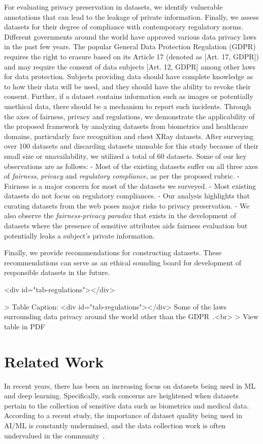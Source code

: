 \documentclass[journal]{IEEEtran}
\begin{document}
For evaluating privacy preservation in datasets, we identify vulnerable annotations that can lead to the leakage of private information. Finally, we assess datasets for their degree of compliance with contemporary regulatory norms. Different governments around the world have approved various data privacy laws in the past few years. The popular General Data Protection Regulation (GDPR)~\cite{regulation2016regulation} requires the right to erasure based on its Article 17 (denoted as [Art. 17, GDPR]) and may require the consent of data subjects [Art. 12, GDPR] among other laws for data protection. Subjects providing data should have complete knowledge as to how their data will be used, and they should have the ability to revoke their consent. Further, if a dataset contains information such as images or potentially unethical data, there should be a mechanism to report such incidents. 
Through the axes of fairness, privacy and regulations, we demonstrate the applicability of the proposed framework by analyzing datasets from biometrics and healthcare domains, particularly face recognition and chest XRay datasets. After surveying over 100 datasets and discarding datasets unusable for this study
because of their small size or unavailability, we utilized a total of 60 datasets. Some of our key observations are as follows: 
-  Most of the existing datasets suffer on all three axes of \textit{fairness}, \textit{privacy} and \textit{regulatory compliance}, as per the proposed rubric.
-  Fairness is a major concern for most of the datasets we surveyed.
-  Most existing datasets do not focus on regulatory compliances.
-  Our analysis highlights that curating datasets from the web poses major risks to privacy preservation.
- We also observe the \textit{fairness-privacy paradox} that exists in the development of datasets where the presence of sensitive attributes aids fairness evaluation but potentially leaks a subject’s private information.

Finally, we provide recommendations for constructing datasets. These recommendations can serve as an ethical sounding board for development of responsible datasets in the future.
\begin{table}<div id="tab-regulations"></div>

> Table Caption: <div id="tab-regulations"></div>
 Some of the laws surrounding data privacy around the world other than the GDPR~\cite{regulation2016regulation}.<br>
> View table in PDF
\end{table}

\section{Related Work}
In recent years, there has been an increasing focus on datasets being used in ML and deep learning. Specifically, such concerns are heightened when datasets pertain to the collection of sensitive data such as biometrics and medical data. According to a recent study, the importance of dataset quality being used in AI/ML is constantly undermined, and the data collection work is often undervalued in the community~\cite{sambasivan2021everyone}.
\end{document}

